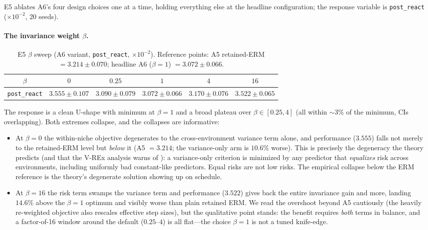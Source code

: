 E5 ablates A6's four design choices one at a time, holding everything else
at the headline configuration; the response variable is
\texttt{post\_react} ($\times 10^{-2}$, 20 seeds).

\paragraph{The invariance weight $\beta$.}

\begin{table}[h]
\centering
\caption{E5 $\beta$ sweep (A6 variant, \texttt{post\_react},
$\times 10^{-2}$). Reference points: A5 retained-ERM $= 3.214 \pm 0.070$;
headline A6 ($\beta = 1$) $= 3.072 \pm 0.066$.}
\label{tab:dd5-e5-beta}
\small
\begin{tabular}{cccccc}
\toprule
$\beta$ & $0$ & $0.25$ & $1$ & $4$ & $16$ \\
\midrule
\texttt{post\_react} & $3.555 \pm 0.107$ & $3.090 \pm 0.079$ &
$3.072 \pm 0.066$ & $3.170 \pm 0.076$ & $3.522 \pm 0.065$ \\
\bottomrule
\end{tabular}
\end{table}

The response is a clean U-shape with minimum at $\beta = 1$ and a broad
plateau over $\beta \in [0.25, 4]$ (all within $\sim 3\%$ of the minimum,
CIs overlapping). Both extremes collapse, and the collapses are
informative:
\begin{itemize}
\item At $\beta = 0$ the within-niche objective degenerates to the
cross-environment variance term alone, and performance ($3.555$) falls not
merely to the retained-ERM level but \emph{below} it
(A5 $= 3.214$; the variance-only arm is $10.6\%$ worse). This is precisely
the degeneracy the theory predicts (and that the V-REx analysis warns of
\citep{krueger2021rex}): a variance-only criterion is minimized by any
predictor that \emph{equalizes} risk across environments, including
uniformly bad constant-like predictors. Equal risks are not low risks. The
empirical collapse below the ERM reference is the theory's degenerate
solution showing up on schedule.
\item At $\beta = 16$ the risk term swamps the variance term and
performance ($3.522$) gives back the entire invariance gain and more,
landing $14.6\%$ above the $\beta = 1$ optimum and visibly worse than plain
retained ERM. We read the overshoot beyond A5 cautiously (the heavily
re-weighted objective also rescales effective step sizes), but the
qualitative point stands: the benefit requires \emph{both} terms in
balance, and a factor-of-16 window around the default ($0.25$--$4$) is all
flat---the choice $\beta = 1$ is not a tuned knife-edge.
\end{itemize}

